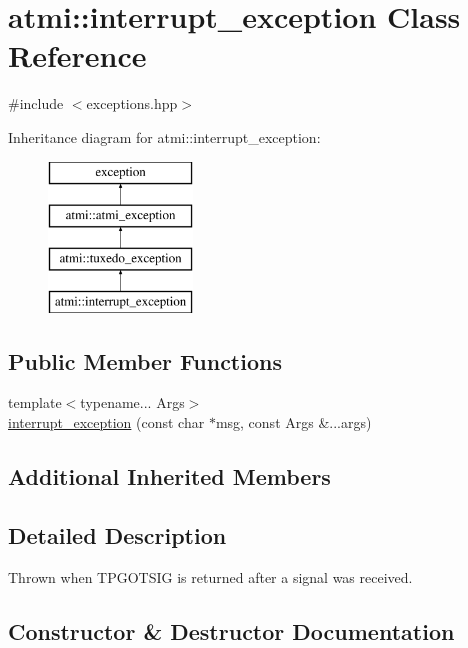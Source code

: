 \hypertarget{classatmi_1_1interrupt__exception}{}\section{atmi\+:\+:interrupt\+\_\+exception Class Reference}
\label{classatmi_1_1interrupt__exception}


{\ttfamily \#include $<$exceptions.\+hpp$>$}

Inheritance diagram for atmi\+:\+:interrupt\+\_\+exception\+:\begin{figure}[H]
\begin{center}
\leavevmode
\includegraphics[height=4.000000cm]{classatmi_1_1interrupt__exception}
\end{center}
\end{figure}
\subsection*{Public Member Functions}
\begin{DoxyCompactItemize}
\item 
{\footnotesize template$<$typename... Args$>$ }\\\hyperlink{classatmi_1_1interrupt__exception_afe1b916f68a10fe0627f396052d45c9f}{interrupt\+\_\+exception} (const char $\ast$msg, const Args \&...args)
\end{DoxyCompactItemize}
\subsection*{Additional Inherited Members}


\subsection{Detailed Description}
Thrown when T\+P\+G\+O\+T\+S\+IG is returned after a signal was received. 

\subsection{Constructor \& Destructor Documentation}
